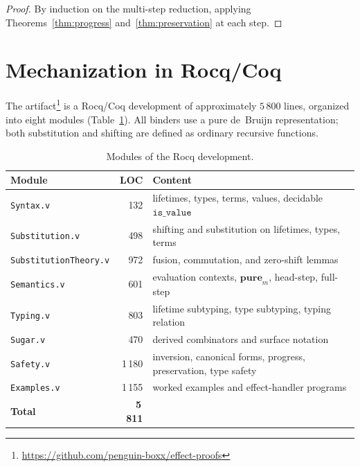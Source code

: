 \documentclass[12pt,a4paper]{article}
\newcommand{\keyword}[1]{\mathbf{#1}}
\begin{document}
    \begin{proof}
        By induction on the multi-step reduction, applying
        Theorems~\ref{thm:progress} and~\ref{thm:preservation} at each step.
    \end{proof}


    \section{Mechanization in Rocq/Coq} \label{sec:mechanization}

    The artifact\footnote{\url{https://github.com/penguin-boxx/effect-proofs}}
    is a Rocq/Coq development of approximately $5\,800$ lines, organized into eight
    modules (Table~\ref{tab:modules}).
    All binders use a pure de~Bruijn representation; both substitution and shifting
    are defined as ordinary recursive functions.

    \begin{table}[h]
        \centering
        \small
        \caption{Modules of the Rocq development.}
        \label{tab:modules}
        \begin{tabular}{@{}lrl@{}}
            \toprule
            \textbf{Module} & \textbf{LOC} & \textbf{Content} \\
            \midrule
            \texttt{Syntax.v}              & 132   & lifetimes, types, terms, values, decidable $\texttt{is\_value}$ \\
            \texttt{Substitution.v}        & 498   & shifting and substitution on lifetimes, types, terms \\
            \texttt{SubstitutionTheory.v}  & 972   & fusion, commutation, and zero-shift lemmas \\
            \texttt{Semantics.v}           & 601   & evaluation contexts, $\keyword{pure}_m$, head-step, full-step \\
            \texttt{Typing.v}              & 803   & lifetime subtyping, type subtyping, typing relation \\
            \texttt{Sugar.v}               & 470   & derived combinators and surface notation \\
            \texttt{Safety.v}              & 1\,180  & inversion, canonical forms, progress, preservation, type safety \\
            \texttt{Examples.v}            & 1\,155  & worked examples and effect-handler programs \\
            \midrule
            \textbf{Total}                 & \textbf{5\,811} & \\
            \bottomrule
        \end{tabular}
    \end{table}
\end{document}
